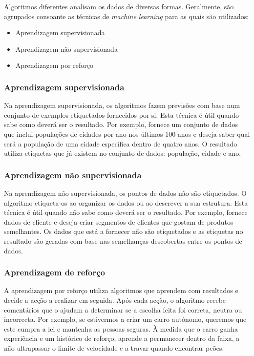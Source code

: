 Algoritmos diferentes analisam os dados de diversas formas.
Geralmente, são agrupados consoante as técnicas de \textit{machine learning} para as quais são utilizados:
\begin{itemize}
  \item Aprendizagem supervisionada
  \item Aprendizagem não supervisionada
  \item Aprendizagem por reforço
\end{itemize}

\subsubsection{Aprendizagem supervisionada}

Na aprendizagem supervisionada, os algoritmos fazem previsões com base num conjunto de exemplos etiquetados fornecidos por si.
Esta técnica é útil quando sabe como deverá ser o resultado.
Por exemplo, fornece um conjunto de dados que inclui populações de cidades por ano nos últimos 100 anos e deseja saber qual será a população de uma cidade específica dentro de quatro anos.
O resultado utiliza etiquetas que já existem no conjunto de dados: população, cidade e ano.

\subsubsection{Aprendizagem não supervisionada}

Na aprendizagem não supervisionada, os pontos de dados não são etiquetados.
O algoritmo etiqueta-os ao organizar os dados ou ao descrever a sua estrutura.
Esta técnica é útil quando não sabe como deverá ser o resultado.
Por exemplo, fornece dados de cliente e deseja criar segmentos de clientes que gostam de produtos semelhantes.
Os dados que está a fornecer não são etiquetados e as etiquetas no resultado são geradas com base nas semelhanças descobertas entre os pontos de dados.

\subsubsection{Aprendizagem de reforço}

A aprendizagem por reforço utiliza algoritmos que aprendem com resultados e decide a acção a realizar em seguida.
Após cada acção, o algoritmo recebe comentários que o ajudam a determinar se a escolha feita foi correta, neutra ou incorrecta.
Por exemplo, se estivermos a criar um carro autónomo, queremos que este cumpra a lei e mantenha as pessoas seguras.
À medida que o carro ganha experiência e um histórico de reforço, aprende a permanecer dentro da faixa, a não ultrapassar o limite de velocidade e a travar quando encontrar peões.

